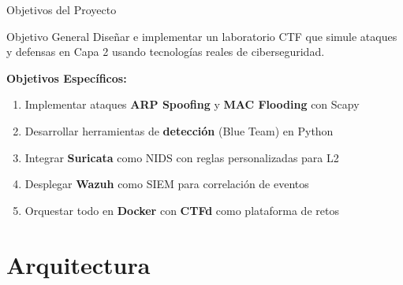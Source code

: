 \documentclass[aspectratio=169, 11pt]{beamer}
\begin{document}
\begin{frame}{Objetivos del Proyecto}
\begin{block}{Objetivo General}
Dise\~nar e implementar un laboratorio CTF que simule ataques y defensas
en Capa 2 usando tecnolog\'ias reales de ciberseguridad.
\end{block}
\vspace{0.5em}
\textbf{Objetivos Espec\'ificos:}
\begin{enumerate}
    \item Implementar ataques \textbf{ARP Spoofing} y \textbf{MAC Flooding} con Scapy
    \item Desarrollar herramientas de \textbf{detecci\'on} (Blue Team) en Python
    \item Integrar \textbf{Suricata} como NIDS con reglas personalizadas para L2
    \item Desplegar \textbf{Wazuh} como SIEM para correlaci\'on de eventos
    \item Orquestar todo en \textbf{Docker} con \textbf{CTFd} como plataforma de retos
\end{enumerate}
\end{frame}

\section{Arquitectura}
\end{document}
